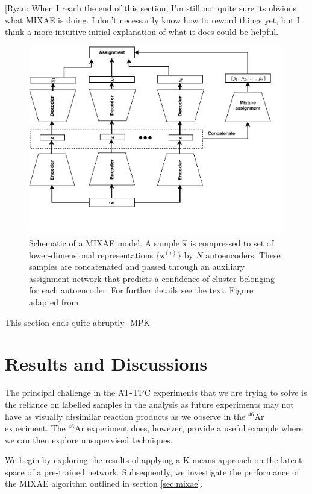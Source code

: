 \documentclass[review,number,sort&compress]{elsarticle}
\begin{document}
{\color{cyan} [Ryan: When I reach the end of this section, I'm still not quite sure its obvious what MIXAE is doing. I don't necessarily know how to reword things yet, but I think a more intuitive initial explanation of what it does could be helpful.}

\begin{figure}[tb]
	\centering
	\includegraphics[width=.8\textwidth]{plots/mixae.pdf}
	\caption[Mixture of autoencoders schematic]{Schematic of a MIXAE model. A sample $\hat{\boldsymbol{x}}$ is compressed to set of lower-dimensional representations $\{\boldsymbol{z}^{(i)}\}$ by $N$ autoencoders. These samples are concatenated and passed through an auxiliary assignment network that predicts a confidence of cluster belonging for each autoencoder. For further details see the text. Figure adapted from \citet{Zhang}}
	\label{fig:mixae}
\end{figure}
{\color{blue} This section ends quite abruptly -MPK}


\section{Results and Discussions}\label{sec:results}

The principal challenge in the AT-TPC experiments that we are trying to solve is the reliance on labelled samples in the analysis as future experiments may not have as visually dissimilar reaction products  as we observe in the ${}^{46}$Ar experiment.  The  ${}^{46}$Ar experiment does, however, provide a useful example where we can then explore unsupervised techniques. 

We begin by exploring the results of applying a K-means approach on the latent space of a pre-trained network. Subsequently, we investigate the performance of the MIXAE algorithm outlined in section \ref{sec:mixae}.
\end{document}
